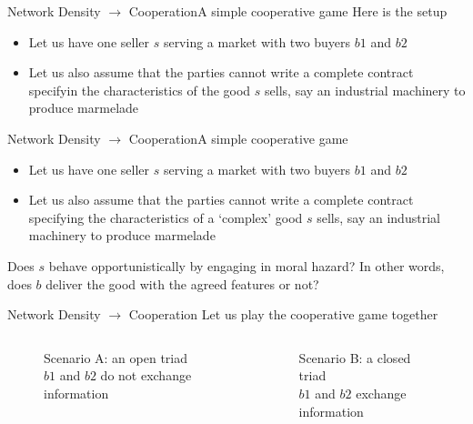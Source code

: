 \documentclass[notes, aspectratio=1610]{beamer}
\begin{document}
\begin{frame}{Network Density $\rightarrow$ Cooperation}{A simple cooperative game}
	Here is the setup 
	
	\begin{itemize}
		\item Let us have one seller $s$ serving a market with two 
		buyers $b1$ and $b2$
		\item Let us also assume that the parties cannot write a 
		complete contract specifyin the characteristics of the good 
		$s$ sells, say an industrial machinery to produce marmelade 
	\end{itemize}
\end{frame}

\begin{frame}{Network Density $\rightarrow$ Cooperation}{A simple cooperative game}
	\begin{itemize}
		\item Let us have one seller $s$ serving a market with two 
		buyers $b1$ and $b2$
		\item Let us also assume that the parties cannot write a 
		complete contract specifying the characteristics of a `complex' good 
		$s$ sells, say an industrial machinery to produce marmelade 
	\end{itemize}

	\vpsace{1em}

	Does $s$ behave opportunistically by engaging in moral hazard? In other 
	words, does $b$ deliver the good with the agreed features or not?
\end{frame}


\begin{frame}
	{Network Density $\rightarrow$ Cooperation}
	{Let us play the cooperative game together}
	\begin{columns}
	\begin{column}{0.5\textwidth}
		\begin{figure}
				\begin{center}
					
				\end{center}
				\caption*{Scenario A: an open triad\\$b1$ and $b2$ do not exchange information}
		\end{figure}
	\end{column}
	\begin{column}{0.5\textwidth}
		\begin{figure}
			\begin{center}
				
			\end{center}
			\caption*{Scenario B: a closed triad\\$b1$ and $b2$ exchange information}
	\end{figure}
	\end{column}
	\end{columns}
\end{frame}
\end{document}
